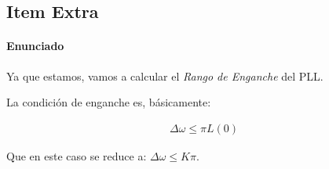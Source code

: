 \subsection{Item Extra} \paragraph{Enunciado} Ya que estamos, vamos a calcular el \textit{Rango de Enganche} del PLL.

La condición de enganche es, básicamente:

\begin{align}
	\Delta\omega \le \pi L(0) \label{ec:rango_enganche}
\end{align}

Que en este caso se reduce a: $\Delta\omega \le K\pi$.